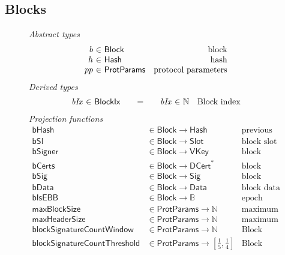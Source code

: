 \documentclass[11pt,a4paper]{article}
\newcommand{\var}[1]{\mathit{#1}}
\newcommand{\fun}[1]{\mathsf{#1}}
\newcommand{\type}[1]{\mathsf{#1}}
\newcommand{\seqof}[1]{#1^{*}}
\newcommand{\Hash}{\type{Hash}}  %
\newcommand{\Slot}{\type{Slot}}
\newcommand{\BlockIx}{\type{BlockIx}}
\newcommand{\Block}{\type{Block}}
\newcommand{\DCert}{\type{DCert}}
\newcommand{\VKey}{\type{VKey}}
\newcommand{\Sig}{\type{Sig}}
\newcommand{\Data}{\type{Data}}
\newcommand{\ProtParams}{\type{ProtParams}} %
\newcommand{\hashname}{bHash}
\newcommand{\maxblocksizename}{maxBlockSize}
\newcommand{\maxheadersizename}{maxHeaderSize}
\newcommand{\isebbname}{bIsEBB}
\newcommand{\bdataname}{bData}
\newcommand{\bcertsname}{bCerts}
\newcommand{\bsigname}{bSig}
\newcommand{\bslname}{bSl}
\newcommand{\bsignername}{bSigner}
\newcommand{\totalf}{\to}
\begin{document}
\subsection{Blocks}
\label{sec:blocks}

\begin{figure}
  \emph{Abstract types}
  \begin{equation*}
    \begin{array}{r@{~\in~}lr}
    b & \Block & \text{block} \\
    h & \Hash   & \text{hash} \\
    pp & \ProtParams & \text{protocol parameters}
    \end{array}
  \end{equation*}
  \emph{Derived types}
  \begin{equation*}
  \begin{array}{r@{~\in~}l@{\qquad=\qquad}r@{~\in~}lr}
    \var{bIx} & \BlockIx & \var{bIx} & \mathbb{N} & \text{Block index}
  \end{array}
  \end{equation*}
  \emph{Projection functions}
  \begin{align*}
    \fun{\hashname} & \in \Block \totalf \Hash
      & \text{previous block's hash} \\
    \fun{\bslname} & \in \Block \totalf \Slot & \text{block slot} \\
    \fun{\bsignername} & \in \Block \totalf \VKey & \text{block signer} \\
    \fun{\bcertsname} & \in \Block \totalf \seqof{\DCert}
      & \text{block certificates} \\
    \fun{\bsigname} & \in \Block \totalf \Sig & \text{block signature} \\
    \fun{\bdataname} & \in \Block \totalf \Data & \text{block data} \\
    \fun{\isebbname} & \in \Block \totalf \mathbb{B} & \text{epoch boundary block check}\\
    \fun{\maxblocksizename} & \in \ProtParams \totalf \mathbb{N} & \text{maximum block size} \\
    \fun{\maxheadersizename} & \in \ProtParams \totalf \mathbb{N}
      & \text{maximum block header size} \\
    \fun{blockSignatureCountWindow} & \in \ProtParams \totalf \mathbb{N} & \text{Block signature count window size} \\
    \fun{blockSignatureCountThreshold} & \in \ProtParams \totalf \left[\frac{1}{5}, \frac{1}{4}\right] & \text{Block signature count threshold}

\end{align*}
\end{figure}
\end{document}
